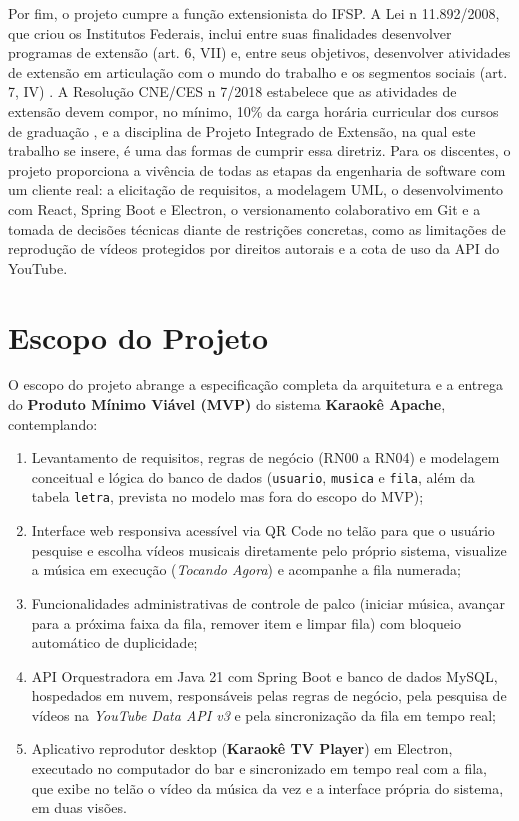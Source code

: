 Por fim, o projeto cumpre a função extensionista do IFSP. A Lei n{\textordmasculine} 11.892/2008, que criou os Institutos Federais, inclui entre suas finalidades desenvolver programas de extensão (art. 6{\textordmasculine}, VII) e, entre seus objetivos, desenvolver atividades de extensão em articulação com o mundo do trabalho e os segmentos sociais (art. 7{\textordmasculine}, IV) \cite{brasil2008lei11892}. A Resolução CNE/CES n{\textordmasculine} 7/2018 estabelece que as atividades de extensão devem compor, no mínimo, 10\% da carga horária curricular dos cursos de graduação \cite{brasil2018cne7}, e a disciplina de Projeto Integrado de Extensão, na qual este trabalho se insere, é uma das formas de cumprir essa diretriz. Para os discentes, o projeto proporciona a vivência de todas as etapas da engenharia de software com um cliente real: a elicitação de requisitos, a modelagem UML, o desenvolvimento com React, Spring Boot e Electron, o versionamento colaborativo em Git e a tomada de decisões técnicas diante de restrições concretas, como as limitações de reprodução de vídeos protegidos por direitos autorais e a cota de uso da API do YouTube.

\section{Escopo do Projeto}

O escopo do projeto abrange a especificação completa da arquitetura e a entrega do \textbf{Produto Mínimo Viável (MVP)} do sistema \textbf{Karaokê Apache}, contemplando:

\begin{enumerate}
  \item Levantamento de requisitos, regras de negócio (RN00 a RN04) e modelagem conceitual e lógica do banco de dados (\texttt{usuario}, \texttt{musica} e \texttt{fila}, além da tabela \texttt{letra}, prevista no modelo mas fora do escopo do MVP);
  \item Interface web responsiva acessível via QR Code no telão para que o usuário pesquise e escolha vídeos musicais diretamente pelo próprio sistema, visualize a música em execução (\textit{Tocando Agora}) e acompanhe a fila numerada;
  \item Funcionalidades administrativas de controle de palco (iniciar música, avançar para a próxima faixa da fila, remover item e limpar fila) com bloqueio automático de duplicidade;
  \item API Orquestradora em Java 21 com Spring Boot e banco de dados MySQL, hospedados em nuvem, responsáveis pelas regras de negócio, pela pesquisa de vídeos na \textit{YouTube Data API v3} e pela sincronização da fila em tempo real;
  \item Aplicativo reprodutor desktop (\textbf{Karaokê TV Player}) em Electron, executado no computador do bar e sincronizado em tempo real com a fila, que exibe no telão o vídeo da música da vez e a interface própria do sistema, em duas visões.
\end{enumerate}

